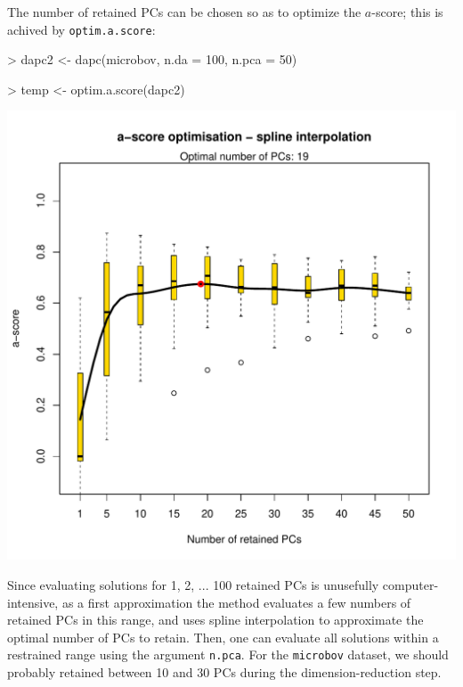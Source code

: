 \documentclass{article}
\begin{document}
The number of retained PCs can be chosen so as to optimize the $a$-score; this is achived by \texttt{optim.a.score}:
\begin{Schunk}
\begin{Sinput}
> dapc2 <- dapc(microbov, n.da = 100, n.pca = 50)
\end{Sinput}
\end{Schunk}
\begin{Schunk}
\begin{Sinput}
> temp <- optim.a.score(dapc2)
\end{Sinput}
\end{Schunk}
\begin{center}
  \includegraphics[width=.7\textwidth]{figs/ascore.pdf}
\end{center}


\noindent Since evaluating solutions for 1, 2, ... 100 retained PCs is unusefully computer-intensive, as a first approximation the
method evaluates a few numbers of retained PCs in this range, and uses spline interpolation to
approximate the optimal number of PCs to retain. Then, one can evaluate all solutions within a
restrained range using the argument \texttt{n.pca}.
For the \texttt{microbov} dataset, we should probably retained between 10 and 30 PCs during the
dimension-reduction step.
\\
\end{document}
